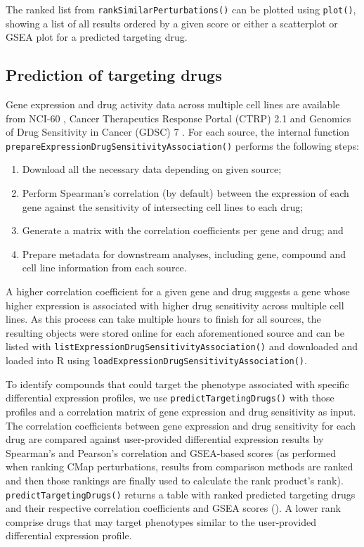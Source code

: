 The ranked list from \texttt{rankSimilarPerturbations()} can be plotted using \texttt{plot()}, showing a list of all results ordered by a given score or either a scatterplot or GSEA plot for a predicted targeting drug.

\subsection{Prediction of targeting drugs}

Gene expression and drug activity data across multiple cell lines are available from NCI-60 \cite{shoemaker:2006wi}, Cancer Therapeutics Response Portal (CTRP) 2.1 \cite{seashore-ludlow:2015ws} and Genomics of Drug Sensitivity in Cancer (GDSC) 7 \cite{yang:2012vk}. For each source, the internal function \texttt{prepareExpressionDrugSensitivityAssociation()} performs the following steps:

\begin{enumerate}
	\item Download all the necessary data depending on given source;
	\item Perform Spearman’s correlation (by default) between the expression of each gene against the sensitivity of intersecting cell lines to each drug;
	\item Generate a matrix with the correlation coefficients per gene and drug; and
	\item Prepare metadata for downstream analyses, including gene, compound and cell line information from each source.
\end{enumerate}

A higher correlation coefficient for a given gene and drug suggests a gene whose higher expression is associated with higher drug sensitivity across multiple cell lines. As this process can take multiple hours to finish for all sources, the resulting objects were stored online for each aforementioned source and can be listed with \texttt{listExpressionDrugSensitivityAssociation()} and downloaded and loaded into R using \texttt{loadExpressionDrugSensitivityAssociation()}.

To identify compounds that could target the phenotype associated with specific differential expression profiles, we use \texttt{predictTargetingDrugs()} with those profiles and a correlation matrix of gene expression and drug sensitivity as input. The correlation coefficients between gene expression and drug sensitivity for each drug are compared against user-provided differential expression results by Spearman’s and Pearson’s correlation and GSEA-based scores (as performed when ranking CMap perturbations, results from comparison methods are ranked and then those rankings are finally used to calculate the rank product’s rank). \texttt{predictTargetingDrugs()} returns a table with ranked predicted targeting drugs and their respective correlation coefficients and GSEA scores (). A lower rank comprise drugs that may target phenotypes similar to the user-provided differential expression profile.


